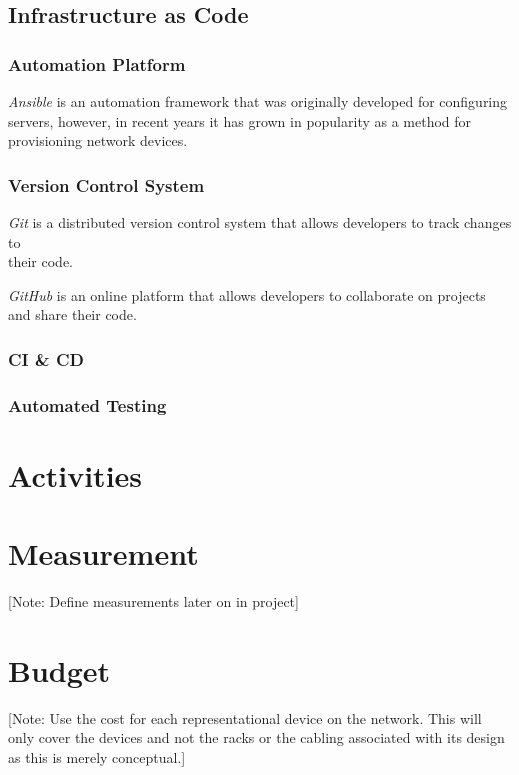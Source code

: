 \documentclass[12pt, letterpaper]{article}
\begin{document}
		
	\subsection{Infrastructure as Code}
	
		\subsubsection{Automation Platform}
\textit{Ansible} is an automation framework that was originally developed for configuring servers, however, in recent years it has grown in popularity as a method for provisioning network devices.

		\subsubsection{Version Control System}
\textit{Git} is a distributed version control system that allows developers to track changes to \\ their code.

\textit{GitHub} is an online platform that allows developers to collaborate on projects and share their code.

		\subsubsection{CI \& CD}
		
		
		\subsubsection{Automated Testing}
		

\newpage

\section{Activities}

\newpage

\section{Measurement}
[Note: Define measurements later on in project]

\newpage

\section{Budget}
[Note: Use the cost for each representational device on the network.
This will only cover the devices and not the racks or the cabling associated with its design as this is merely conceptual.]
\end{document}
